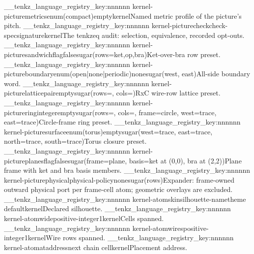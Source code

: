 \__tenkz_language_registry_key:nnnnnn {kernel-picture}{metrics}{enum(compact)}{empty}{kernel}{Named metric profile of the picture's pitch.}
\__tenkz_language_registry_key:nnnnnn {kernel-picture}{check}{check-spec}{signature}{kernel}{The tenkzeq audit: selection, equivalence, recorded opt-outs.}
\__tenkz_language_registry_key:nnnnnn {kernel-picture}{sandwich}{flag}{false}{sugar(rows={ket,op,bra})}{Ket-over-bra row preset.}
\__tenkz_language_registry_key:nnnnnn {kernel-picture}{boundary}{enum(open|none|periodic)}{none}{sugar(west, east)}{All-side boundary word.}
\__tenkz_language_registry_key:nnnnnn {kernel-picture}{lattice}{pair}{empty}{sugar(rows=, cols=)}{RxC wire-row lattice preset.}
\__tenkz_language_registry_key:nnnnnn {kernel-picture}{ring}{integer}{empty}{sugar(rows=, cols=, frame=circle, west=trace, east=trace)}{Circle-frame ring preset.}
\__tenkz_language_registry_key:nnnnnn {kernel-picture}{surface}{enum(torus)}{empty}{sugar(west=trace, east=trace, north=trace, south=trace)}{Torus closure preset.}
\__tenkz_language_registry_key:nnnnnn {kernel-picture}{planes}{flag}{false}{sugar(frame={plane, basis={ket at (0,0), bra at (2,2)}})}{Plane frame with ket and bra basis members.}
\__tenkz_language_registry_key:nnnnnn {kernel-picture}{physical}{physical-policy}{none}{sugar(rows)}{Expander: frame-owned outward physical port per frame-cell atom; geometric overlays are excluded.}
\__tenkz_language_registry_key:nnnnnn {kernel-atom}{skin}{silhouette-name}{theme default}{kernel}{Declared silhouette.}
\__tenkz_language_registry_key:nnnnnn {kernel-atom}{wide}{positive-integer}{1}{kernel}{Cells spanned.}
\__tenkz_language_registry_key:nnnnnn {kernel-atom}{wires}{positive-integer}{1}{kernel}{Wire rows spanned.}
\__tenkz_language_registry_key:nnnnnn {kernel-atom}{at}{address}{next chain cell}{kernel}{Placement address.}
